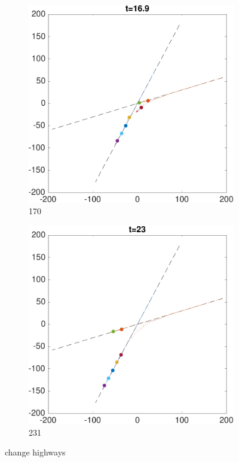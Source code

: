 \begin{figure}
    \begin{subfigure}{0.23\textwidth} \label{subfig:ch_170}
        \includegraphics[width=\textwidth]{fig/ch_170}
        \caption{170}
    \end{subfigure}
    \begin{subfigure}{0.23\textwidth} \label{subfig:ch_231}
        \includegraphics[width=\textwidth]{fig/ch_231}
        \caption{231}
    \end{subfigure}   
    \caption{change highways}    
\end{figure}
